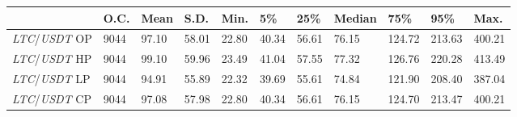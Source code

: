 \begin{tabular}{lllllllllll}
\toprule
 & \textbf{O.C.} & \textbf{Mean} & \textbf{S.D.} & \textbf{Min.} & \textbf{5\%} & \textbf{25\%} & \textbf{Median} & \textbf{75\%} & \textbf{95\%} & \textbf{Max.} \\
\midrule
\emph{LTC}/\emph{USDT} OP & 9044 & 97.10 & 58.01 & 22.80 & 40.34 & 56.61 & 76.15 & 124.72 & 213.63 & 400.21 \\
\emph{LTC}/\emph{USDT} HP & 9044 & 99.10 & 59.96 & 23.49 & 41.04 & 57.55 & 77.32 & 126.76 & 220.28 & 413.49 \\
\emph{LTC}/\emph{USDT} LP & 9044 & 94.91 & 55.89 & 22.32 & 39.69 & 55.61 & 74.84 & 121.90 & 208.40 & 387.04 \\
\emph{LTC}/\emph{USDT} CP & 9044 & 97.08 & 57.98 & 22.80 & 40.34 & 56.61 & 76.15 & 124.70 & 213.47 & 400.21 \\
\bottomrule
\end{tabular}
